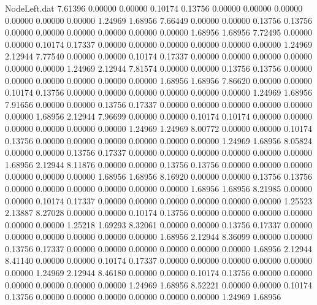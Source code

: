 \begin{filecontents}{NodeLeft.dat}
   7.61396    0.00000    0.00000     0.10174    0.13756    0.00000    0.00000    0.00000    0.00000    0.00000    0.00000    1.24969    1.68956
   7.66449    0.00000    0.00000     0.13756    0.13756    0.00000    0.00000    0.00000    0.00000    0.00000    0.00000    1.68956    1.68956
   7.72495    0.00000    0.00000     0.10174    0.17337    0.00000    0.00000    0.00000    0.00000    0.00000    0.00000    1.24969    2.12944
   7.77540    0.00000    0.00000     0.10174    0.17337    0.00000    0.00000    0.00000    0.00000    0.00000    0.00000    1.24969    2.12944
   7.81574    0.00000    0.00000     0.13756    0.13756    0.00000    0.00000    0.00000    0.00000    0.00000    0.00000    1.68956    1.68956
   7.86620    0.00000    0.00000     0.10174    0.13756    0.00000    0.00000    0.00000    0.00000    0.00000    0.00000    1.24969    1.68956
   7.91656    0.00000    0.00000     0.13756    0.17337    0.00000    0.00000    0.00000    0.00000    0.00000    0.00000    1.68956    2.12944
   7.96699    0.00000    0.00000     0.10174    0.10174    0.00000    0.00000    0.00000    0.00000    0.00000    0.00000    1.24969    1.24969
   8.00772    0.00000    0.00000     0.10174    0.13756    0.00000    0.00000    0.00000    0.00000    0.00000    0.00000    1.24969    1.68956
   8.05824    0.00000    0.00000     0.13756    0.17337    0.00000    0.00000    0.00000    0.00000    0.00000    0.00000    1.68956    2.12944
   8.11876    0.00000    0.00000     0.13756    0.13756    0.00000    0.00000    0.00000    0.00000    0.00000    0.00000    1.68956    1.68956
   8.16920    0.00000    0.00000     0.13756    0.13756    0.00000    0.00000    0.00000    0.00000    0.00000    0.00000    1.68956    1.68956
   8.21985    0.00000    0.00000     0.10174    0.17337    0.00000    0.00000    0.00000    0.00000    0.00000    0.00000    1.25523    2.13887
   8.27028    0.00000    0.00000     0.10174    0.13756    0.00000    0.00000    0.00000    0.00000    0.00000    0.00000    1.25218    1.69293
   8.32061    0.00000    0.00000     0.13756    0.17337    0.00000    0.00000    0.00000    0.00000    0.00000    0.00000    1.68956    2.12944
   8.36099    0.00000    0.00000     0.13756    0.17337    0.00000    0.00000    0.00000    0.00000    0.00000    0.00000    1.68956    2.12944
   8.41140    0.00000    0.00000     0.10174    0.17337    0.00000    0.00000    0.00000    0.00000    0.00000    0.00000    1.24969    2.12944
   8.46180    0.00000    0.00000     0.10174    0.13756    0.00000    0.00000    0.00000    0.00000    0.00000    0.00000    1.24969    1.68956
   8.52221    0.00000    0.00000     0.10174    0.13756    0.00000    0.00000    0.00000    0.00000    0.00000    0.00000    1.24969    1.68956

\end{filecontents}
